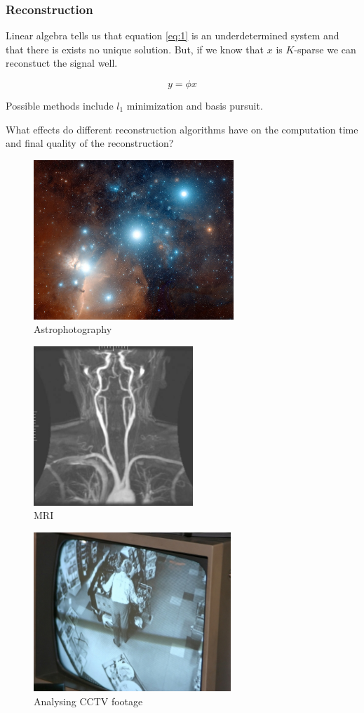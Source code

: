 \documentclass{beamer}
\begin{document}
\begin{frame}
  \frametitle{Reconstruction}
Linear algebra tells us that equation \ref{eq:1} is an underdetermined system  and that there is exists no unique solution. But, if we know that $x$  is $K$-sparse we can reconstuct the signal well.

\begin{equation}
  \label{eq:1}
  y = \phi x
\end{equation}

Possible methods include $l_1$ minimization and basis pursuit.

What effects do different reconstruction algorithms have on the computation time and final quality of the reconstruction?
\end{frame}

\begin{frame}
  \begin{figure}[h]
    \centering
    \includegraphics[height=6cm]{astrophotography}
    \caption{Astrophotography}
    \label{fig:astro}
  \end{figure}
\end{frame}
 
  \begin{frame}
    \begin{figure}[h]
  \centering
  \includegraphics[height=6cm]{mri}
  \caption{MRI }
  \label{fig:mri}
\end{figure}
  \end{frame}

  \begin{frame}
  \begin{figure}[h]
  \centering
  \includegraphics[height=6cm]{cctv}
  \caption{Analysing CCTV footage}
  \label{fig:cctv}
\end{figure}  
  \end{frame}


 
\end{document}
